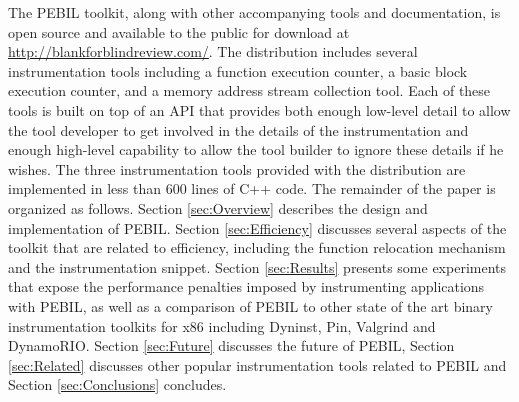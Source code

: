 The PEBIL toolkit, along with other accompanying tools and documentation, is
open source and available to the public for download at
\url{http://blankforblindreview.com/}. The distribution includes
several instrumentation tools including a function execution counter, a basic
block execution counter, and a memory address stream collection tool. Each of
these tools is built on top of an API that provides both enough low-level detail
to allow the tool developer to get involved in the details of the
instrumentation and enough high-level capability to allow the tool builder to
ignore these details if he wishes. The three instrumentation tools provided with
the distribution are implemented in less than 600 lines of C++ code. The
remainder of the paper is organized as follows. Section \ref{sec:Overview}
describes the design and implementation of PEBIL. Section \ref{sec:Efficiency}
discusses several aspects of the toolkit that are related to efficiency,
including the function relocation mechanism and the instrumentation snippet.
Section \ref{sec:Results} presents some experiments that expose the performance
penalties imposed by instrumenting applications with PEBIL, as well as a
comparison of PEBIL to other state of the art binary instrumentation toolkits
for x86 including Dyninst, Pin, Valgrind and DynamoRIO. Section \ref{sec:Future}
discusses the future of PEBIL, Section \ref{sec:Related} discusses other popular
instrumentation tools related to PEBIL and Section \ref{sec:Conclusions}
concludes.
